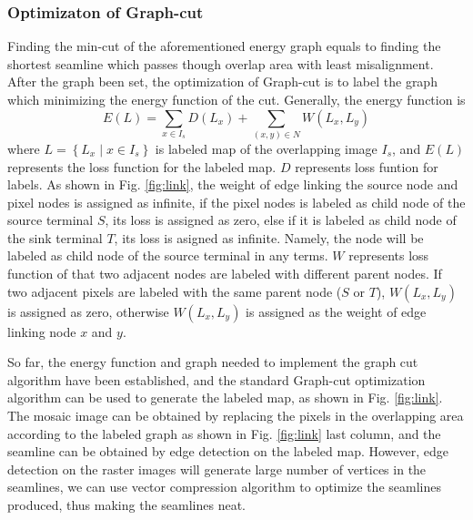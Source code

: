 \documentclass[journal]{IEEEtran}
\begin{document}
\subsubsection{Optimizaton of Graph-cut}
Finding the min-cut of the aforementioned energy graph equals to finding the shortest seamline which passes though overlap area with least misalignment. After the graph been set, the optimization of Graph-cut is to label the graph which minimizing the energy function of the cut. Generally, the energy function is
\begin{equation}\label{eq5}
E(L)=\sum_{x\in I_s} D(L_x)+\sum_{(x,y)\in N} W(L_x,L_y)
\end{equation}
where $L=\left \{ L_{x}\mid x\in I_s \right \}$ is labeled map of the overlapping image $I_s$, and $E(L)$ represents the loss function for the labeled map. $D$ represents loss funtion for labels. As shown in Fig. \ref{fig:link}, the weight of edge linking the source node and pixel nodes is assigned as infinite, if the pixel nodes is labeled as child node of the source terminal $S$, its loss is assigned as zero, else if it is labeled as child node of the sink terminal $T$, its loss is asigned as infinite. Namely, the node will be labeled as child node of the source terminal in any terms. $W$ represents loss function of that two adjacent nodes are labeled with different parent nodes. If two adjacent pixels are labeled with the same parent node ($S$ or $T$), $W(L_x,L_y)$ is assigned as zero, otherwise $W(L_x,L_y)$ is assigned as the weight of edge linking node $x$ and $y$.

So far, the energy function and graph needed to implement the graph cut algorithm have been established, and the standard Graph-cut optimization algorithm can be used to generate the labeled map, as shown in Fig. \ref{fig:link}. The mosaic image can be obtained by replacing the pixels in the overlapping area according to the labeled graph as shown in Fig. \ref{fig:link} last column, and the seamline can be obtained by edge detection on the labeled map. However, edge detection on the raster images will generate large number of vertices in the seamlines, we can use vector compression algorithm to optimize the seamlines produced, thus making the seamlines neat.
\end{document}
